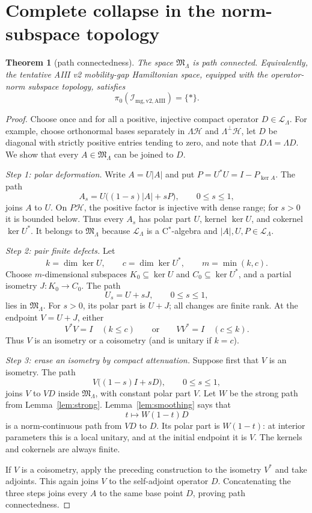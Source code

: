 \documentclass[11pt]{article}
\newtheorem{theorem}{Theorem}
\newcommand{\HH}{\mathcal H}
\newcommand{\LL}{\mathcal L}
\newcommand{\MM}{\mathfrak M}
\newcommand{\Ker}{\operatorname{ker}}
\begin{document}
\section{Complete collapse in the norm-subspace topology}

\begin{theorem}[path connectedness]\label{thm:main}
The space \(\MM_\Lambda\) is path connected.  Equivalently, the tentative
AIII v2 mobility-gap Hamiltonian space, equipped with the operator-norm
subspace topology, satisfies
\[
 \pi_0(\mathcal I_{\mathrm{mg,v2,AIII}})=\{*\}.
\]
\end{theorem}

\begin{proof}
Choose once and for all a positive, injective compact operator
\(D\in\LL_\Lambda\).  For example, choose orthonormal bases separately in
\(\Lambda\HH\) and \(\Lambda^\perp\HH\), let \(D\) be diagonal with
strictly positive entries tending to zero, and note that \(D\Lambda=\Lambda
D\).  We show that every \(A\in\MM_\Lambda\) can be joined to \(D\).

\emph{Step 1: polar deformation.}
Write \(A=U|A|\) and put \(P=U^*U=I-P_{\Ker A}\).  The path
\[
 A_s=U\big((1-s)|A|+sP\big),\qquad 0\leq s\leq1,
\]
joins \(A\) to \(U\).  On \(P\HH\), the positive factor is injective with
dense range; for \(s>0\) it is bounded below.  Thus every \(A_s\) has polar
part \(U\), kernel \(\Ker U\), and cokernel \(\Ker U^*\).  It belongs to
\(\MM_\Lambda\) because \(\LL_\Lambda\) is a C\(^*\)-algebra and
\(|A|,U,P\in\LL_\Lambda\).

\emph{Step 2: pair finite defects.}
Let
\[
 k=\dim\Ker U,\qquad c=\dim\Ker U^*,\qquad m=\min(k,c).
\]
Choose \(m\)-dimensional subspaces \(K_0\subseteq\Ker U\) and
\(C_0\subseteq\Ker U^*\), and a partial isometry \(J:K_0\to C_0\).
The path
\[
 U_s=U+sJ,\qquad 0\leq s\leq1,
\]
lies in \(\MM_\Lambda\).  For \(s>0\), its polar part is \(U+J\);
all changes are finite rank.  At the endpoint \(V=U+J\), either
\[
 V^*V=I\quad(k\leq c)
 \qquad\text{or}\qquad
 VV^*=I\quad(c\leq k).
\]
Thus \(V\) is an isometry or a coisometry (and is unitary if \(k=c\)).

\emph{Step 3: erase an isometry by compact attenuation.}
Suppose first that \(V\) is an isometry.  The path
\[
 V\big((1-s)I+sD\big),\qquad 0\leq s\leq1,
\]
joins \(V\) to \(VD\) inside \(\MM_\Lambda\), with constant polar part
\(V\).  Let \(W\) be the strong path from Lemma~\ref{lem:strong}.
Lemma~\ref{lem:smoothing} says that
\[
 t\longmapsto W(1-t)D
\]
is a norm-continuous path from \(VD\) to \(D\).  Its polar part is
\(W(1-t)\): at interior parameters this is a local unitary, and at the
initial endpoint it is \(V\).  The kernels and cokernels are always finite.

If \(V\) is a coisometry, apply the preceding construction to the isometry
\(V^*\) and take adjoints.  This again joins \(V\) to the self-adjoint
operator \(D\).  Concatenating the three steps joins every \(A\) to the same
base point \(D\), proving path connectedness.
\end{proof}
\end{document}
